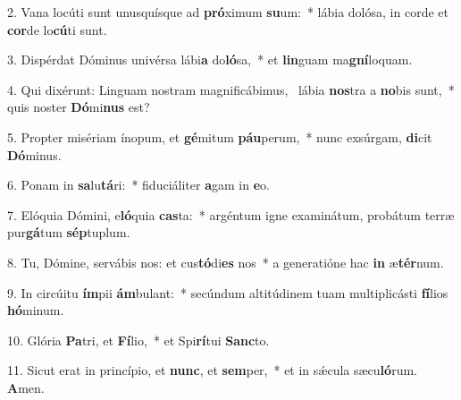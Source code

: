 2. Vana locúti sunt unusquísque ad \textbf{pró}ximum \textbf{su}um:~*  lábia dolósa, in corde et \textbf{cor}de lo\textbf{cú}ti sunt.\

3. Dispérdat Dóminus univérsa lábi\textbf{a} do\textbf{ló}sa,~*  et \textbf{lin}guam ma\textbf{gní}loquam.\

4. Qui dixérunt: Linguam nostram magnificábimus, \dag\  lábia \textbf{nos}tra a \textbf{no}bis sunt,~*  quis noster \textbf{Dó}mi\textbf{nus} est?\

5. Propter misériam ínopum, et \textbf{gé}mitum \textbf{páu}perum,~*  nunc exsúrgam, \textbf{di}cit \textbf{Dó}minus.\

6. Ponam in \textbf{sa}lu\textbf{tá}ri:~*  fiduciáliter \textbf{a}gam in \textbf{e}o.\

7. Elóquia Dómini, e\textbf{ló}quia \textbf{cas}ta:~*  argéntum igne examinátum, probátum terræ pur\textbf{gá}tum \textbf{sép}tuplum.\

8. Tu, Dómine, servábis nos: et cus\textbf{tó}di\textbf{es} nos~*  a generatióne hac \textbf{in} æ\textbf{tér}num.\

9. In circúitu \textbf{ím}pii \textbf{ám}bulant:~*  secúndum altitúdinem tuam multiplicásti \textbf{fí}lios \textbf{hó}minum.\

10. Glória \textbf{Pa}tri, et \textbf{Fí}lio,~*  et Spi\textbf{rí}tui \textbf{Sanc}to.\

11. Sicut erat in princípio, et \textbf{nunc}, et \textbf{sem}per,~*  et in sǽcula sæcu\textbf{ló}rum. \textbf{A}men.\


